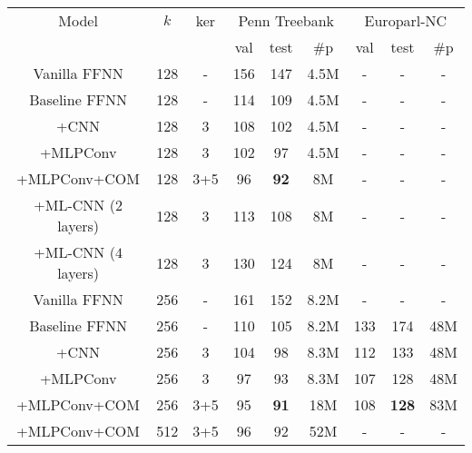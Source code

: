 \begin{table*}[t]
	\centering
	\begin{tabular}{|c|c|c|c|c|c|c|c|c|}
		\hline
		Model & $k$ & ker & \multicolumn{3}{c|}{Penn Treebank} & \multicolumn{3}{c|}{Europarl-NC} \\
		& & &  val & test & \#p & val & test & \#p \\
		
		
		\hline 
		Vanilla FFNN      & 128 & -   & 156 & 147 & 4.5M        & - & - & -   \\
		Baseline FFNN         & 128 & -   & 114 & 109 & 4.5M        & - & - & -   \\
		+CNN              & 128 & 3   & 108 & 102 & 4.5M        & - & - &  -  \\
		+MLPConv          & 128 & 3   & 102 &  97 & 4.5M        & - & - &  -  \\
		+MLPConv+COM      & 128 & 3+5 & 96  &  {\bf 92} & 8M         & - & - & -    \\
		+ML-CNN ($2$ layers) & 128 & 3   & 113 & 108 &  8M       & - & -  & -  \\
		+ML-CNN ($4$ layers) & 128 & 3   & 130 & 124 &  8M       & - & -  & -   \\
		
		
		\hline
		Vanilla FFNN     & 256 & -   & 161 &  152  &  8.2M       & - & - & -   \\
		Baseline FFNN        & 256 & -   & 110 &  105  & 8.2M        & 133 & 174 & 48M \\
		+CNN             & 256 & 3   & 104 &  98   &  8.3M      & 112 & 133 & 48M \\
		+MLPConv         & 256 & 3   & 97  &  93   &  8.3M      & 107 & {128} & 48M \\
		+MLPConv+COM     & 256 & 3+5 & 95  &  \textbf{91} & 18M  & 108 & \textbf{128} & 83M \\
		+MLPConv+COM     & 512 & 3+5 & 96  &  92 & 52M  & - & - & - \\
		

\end{tabular}
\end{table*}

